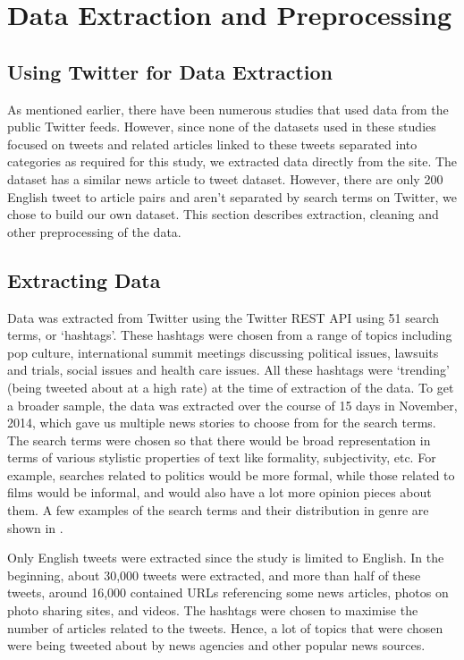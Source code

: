 \section{Data Extraction and Preprocessing}

\subsection{Using Twitter for Data Extraction}

As mentioned earlier, there have been numerous studies that used data from the public Twitter feeds. However, since none of the datasets used in these studies focused on tweets and related articles linked to these tweets separated into categories as required for this study, we extracted data directly from the site. The \cite{lloret2013towards} dataset has a similar news article to tweet dataset. However, there are only 200 English tweet to article pairs and aren't separated by search terms on Twitter, we chose to build our own dataset. This section describes extraction, cleaning and other preprocessing of the data.

\subsection{Extracting Data}

Data was extracted from Twitter using the Twitter REST API using 51 search terms, or ‘hashtags’. These hashtags were chosen from a range of topics including pop culture,  international summit meetings discussing political issues, lawsuits and trials, social issues and health care issues. All these hashtags were ‘trending’ (being tweeted about at a high rate) at the time of extraction of the data. To get a broader sample, the data was extracted over the course of 15 days in November, 2014, which gave us multiple news stories to choose from for the search terms. The search terms were chosen so that there would be broad representation in terms of various stylistic properties of text like formality, subjectivity, etc. For example, searches related to politics would be more formal, while those related to films would be informal, and would also have a lot more opinion pieces about them. A few examples of the search terms and their distribution in genre are shown in .

Only English tweets were extracted since the study is limited to English. In the beginning, about 30,000 tweets were extracted, and more than half of these tweets, around 16,000 contained URLs referencing some news articles, photos on photo sharing sites, and videos. The hashtags were chosen to maximise the number of articles related to the tweets. Hence, a lot of topics that were chosen were being tweeted about by news agencies and other popular news sources.

